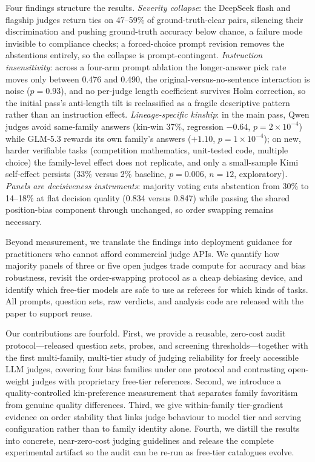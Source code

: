 \documentclass[review,12pt]{elsarticle}
\begin{document}
Four findings structure the results. \emph{Severity collapse}: the
DeepSeek flash and flagship judges return ties on 47--59\% of
ground-truth-clear pairs, silencing their discrimination and pushing
ground-truth accuracy below chance, a failure mode invisible to compliance
checks; a forced-choice prompt revision removes the abstentions entirely,
so the collapse is prompt-contingent. \emph{Instruction insensitivity}:
across a four-arm prompt ablation the longer-answer pick rate moves only
between 0.476 and 0.490, the original-versus-no-sentence interaction is
noise ($p=0.93$), and no per-judge length coefficient survives Holm
correction, so the initial pass's anti-length tilt is reclassified as a
fragile descriptive pattern rather than an instruction effect.
\emph{Lineage-specific kinship}: in the main pass, Qwen judges avoid
same-family answers (kin-win 37\%, regression $-0.64$,
$p=2\times10^{-4}$) while GLM-5.3 rewards its own family's answers
($+1.10$, $p=1\times10^{-4}$); on new, harder verifiable tasks
(competition mathematics, unit-tested code, multiple choice) the
family-level effect does not replicate, and only a small-sample Kimi
self-effect persists (33\% versus 2\% baseline, $p=0.006$, $n=12$,
exploratory). \emph{Panels are decisiveness instruments}: majority voting
cuts abstention from 30\% to 14--18\% at flat decision quality (0.834
versus 0.847) while passing the shared position-bias component through
unchanged, so order swapping remains necessary.

Beyond measurement, we translate the findings into deployment guidance for
practitioners who cannot afford commercial judge APIs. We quantify how
majority panels of three or five open judges trade compute for accuracy and
bias robustness, revisit the order-swapping protocol as a cheap debiasing
device, and identify which free-tier models are safe to use as referees for
which kinds of tasks. All prompts, question sets, raw verdicts, and analysis
code are released with the paper to support reuse.

Our contributions are fourfold. First, we provide a reusable, zero-cost
audit protocol---released question sets, probes, and screening
thresholds---together with the first multi-family, multi-tier study of
judging reliability for freely accessible LLM judges, covering four bias
families under one protocol and contrasting
open-weight judges with proprietary free-tier references. Second, we
introduce a quality-controlled kin-preference measurement that separates
family favoritism from genuine quality differences. Third, we give
within-family tier-gradient evidence on order stability that links judge
behaviour to model tier and serving configuration rather than to family
identity alone. Fourth, we distill the results
into concrete, near-zero-cost judging guidelines and release the complete
experimental artifact so the audit can be re-run as free-tier catalogues
evolve.
\end{document}
